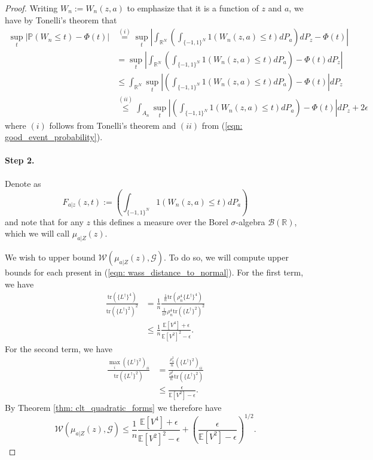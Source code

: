 \documentclass{article}
\newcommand{\Reals}{\mathbb{R}}
\newcommand{\Expect}[1]{\mathbb{E}\left[ #1 \right]}
\newcommand{\Prob}[1]{\mathbb{P}\left( #1 \right)}
\newcommand{\abs}[1]{\left \lvert #1 \right \rvert}
\newcommand{\Linv}{L^{\dagger}}
\newcommand{\tr}{\text{tr}}
\theoremstyle{alden}
\theoremstyle{definition}
\theoremstyle{remark}
\begin{document}
\begin{proof}
	
	Writing $W_n := W_n(z,a)$ to emphasize that it is a function of $z$ and $a$, we have by Tonelli's theorem that
	\begin{align}
	\label{eqn: conditional_ks_distance}
	\sup_{t} \abs{\Prob{W_n \leq t} - \Phi(t)} & \overset{(i)}{=} \sup_{t} \abs{ \int_{\Reals^N} \left( \int_{\{-1,1\}^N} 1(W_n(z,a) \leq t) dP_a\right) dP_z - \Phi(t) } \nonumber \\
	& = \sup_{t} \abs{ \int_{\Reals^N} \left( \int_{\{-1,1\}^N} 1(W_n(z,a) \leq t) dP_a\right) - \Phi(t)dP_z } \nonumber \\
	& \leq \int_{\Reals^N} \sup_{t} \abs{\left( \int_{\{-1,1\}^N} 1(W_n(z,a) \leq t)   dP_a\right) - \Phi(t) } dP_z \nonumber \\
	& \overset{(ii)}{\leq} \int_{A_n} \sup_{t} \abs{\left( \int_{\{-1,1\}^N} 1(W_n(z,a) \leq t) dP_a\right) - \Phi(t)} dP_z + 2 \epsilon
	\end{align}
	where $(i)$ follows from Tonelli's theorem and $(ii)$ from (\ref{eqn: good_event_probability}).
	
	\paragraph{Step 2.}
	
	Denote as
	\begin{equation*}
	F_{a|z}(z, t) := \left( \int_{\{-1,1\}^N} 1(W_n(z,a) \leq t) dP_a\right)
	\end{equation*}
	and note that for any $z$ this defines a measure over the Borel $\sigma$-algebra $\mathcal{B}(\Reals)$, which we will call $\mu_{a|Z}(z)$.
	
	We wish to upper bound $\mathcal{W}(\mu_{a|Z}(z), \mathcal{G})$. To do so, we will compute upper bounds for each present in (\ref{eqn: wass_distance_to_normal}). For the first term, we have
	\begin{align*}
	\frac{\tr(\{\Linv \}^4)}{\tr(\{ \Linv \}^2)^2} & = \frac{1}{n} \frac{\frac{1}{n} \tr(\rho_n^4 \{\Linv \}^4)}{ \frac{1}{n^2} \rho_n^4 \tr(\{ \Linv \}^2)^2} \\
	& \leq \frac{1}{n} \frac{\Expect{V^4} + \epsilon}{\Expect{V^2}^2 - \epsilon}.
	\end{align*}
	For the second term, we have
	\begin{align*}
	\frac{ \underset{i}{\max}(\{\Linv\}^2)_{ii} }{ \tr(\{\Linv\}^2) } & = \frac{ \frac{\rho_n^2}{n} (\{\Linv\}^2)_{ii}}{ \frac{\rho_n^2}{n} \tr(\{\Linv\}^2) } \\
	& \leq \frac{ \epsilon }{ \Expect{V^2} - \epsilon }.
	\end{align*}
	By Theorem \ref{thm: clt_quadratic_forms} we therefore have
	\begin{equation}
	\label{eqn: wasserstein_conditional_bound}
	\mathcal{W}(\mu_{a|Z}(z), \mathcal{G} ) \leq \frac{1}{n} \frac{\Expect{V^4} + \epsilon}{\Expect{V^2}^2 - \epsilon} + \left(\frac{ \epsilon }{ \Expect{V^2} - \epsilon } \right)^{1/2}.
	\end{equation}
	

\end{proof}
\end{document}
